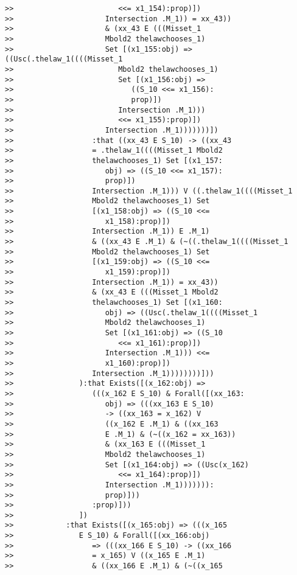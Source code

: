 \documentclass[12pt]{article}
\begin{document}
\begin{verbatim}
>>                        <<= x1_154):prop)])
>>                     Intersection .M_1)) = xx_43))
>>                     & (xx_43 E (((Misset_1
>>                     Mbold2 thelawchooses_1)
>>                     Set [(x1_155:obj) => ((Usc(.thelaw_1((((Misset_1
>>                        Mbold2 thelawchooses_1)
>>                        Set [(x1_156:obj) =>
>>                           ((S_10 <<= x1_156):
>>                           prop)])
>>                        Intersection .M_1)))
>>                        <<= x1_155):prop)])
>>                     Intersection .M_1)))))))])
>>                  :that ((xx_43 E S_10) -> ((xx_43
>>                  = .thelaw_1((((Misset_1 Mbold2
>>                  thelawchooses_1) Set [(x1_157:
>>                     obj) => ((S_10 <<= x1_157):
>>                     prop)])
>>                  Intersection .M_1))) V ((.thelaw_1((((Misset_1
>>                  Mbold2 thelawchooses_1) Set
>>                  [(x1_158:obj) => ((S_10 <<=
>>                     x1_158):prop)])
>>                  Intersection .M_1)) E .M_1)
>>                  & ((xx_43 E .M_1) & (~((.thelaw_1((((Misset_1
>>                  Mbold2 thelawchooses_1) Set
>>                  [(x1_159:obj) => ((S_10 <<=
>>                     x1_159):prop)])
>>                  Intersection .M_1)) = xx_43))
>>                  & (xx_43 E (((Misset_1 Mbold2
>>                  thelawchooses_1) Set [(x1_160:
>>                     obj) => ((Usc(.thelaw_1((((Misset_1
>>                     Mbold2 thelawchooses_1)
>>                     Set [(x1_161:obj) => ((S_10
>>                        <<= x1_161):prop)])
>>                     Intersection .M_1))) <<=
>>                     x1_160):prop)])
>>                  Intersection .M_1))))))))]))
>>               ):that Exists([(x_162:obj) =>
>>                  (((x_162 E S_10) & Forall([(xx_163:
>>                     obj) => (((xx_163 E S_10)
>>                     -> ((xx_163 = x_162) V
>>                     ((x_162 E .M_1) & ((xx_163
>>                     E .M_1) & (~((x_162 = xx_163))
>>                     & (xx_163 E (((Misset_1
>>                     Mbold2 thelawchooses_1)
>>                     Set [(x1_164:obj) => ((Usc(x_162)
>>                        <<= x1_164):prop)])
>>                     Intersection .M_1))))))):
>>                     prop)]))
>>                  :prop)]))
>>               ])
>>            :that Exists([(x_165:obj) => (((x_165
>>               E S_10) & Forall([(xx_166:obj)
>>                  => (((xx_166 E S_10) -> ((xx_166
>>                  = x_165) V ((x_165 E .M_1)
>>                  & ((xx_166 E .M_1) & (~((x_165

\end{verbatim}
\end{document}
